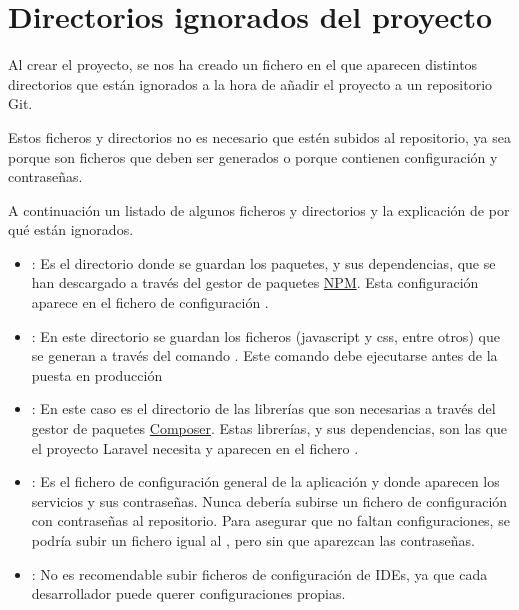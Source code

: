 \chapter{Directorios ignorados del proyecto}

Al crear el proyecto, se nos ha creado un fichero  en el que aparecen distintos directorios que están ignorados a la hora de añadir el proyecto a un repositorio Git.

Estos ficheros y directorios no es necesario que estén subidos al repositorio, ya sea porque son ficheros que deben ser generados o porque contienen configuración y contraseñas.

A continuación un listado de algunos ficheros y directorios y la explicación de por qué están ignorados.

\begin{itemize}
    \item {} : Es el directorio donde se guardan los paquetes, y sus dependencias, que se han descargado a través del gestor de paquetes \href{https://www.npmjs.com/}{NPM}. Esta configuración aparece en el fichero de configuración  .

    \item {} : En este directorio se guardan los ficheros (javascript y css, entre otros) que se generan a través del comando  . Este comando debe ejecutarse antes de la puesta en producción

    \item {} : En este caso es el directorio de las librerías que son necesarias a través del gestor de paquetes \href{https://getcomposer.org/}{Composer}. Estas librerías, y sus dependencias, son las que el proyecto Laravel necesita y aparecen en el fichero  .

    \item {} : Es el fichero de configuración general de la aplicación y donde aparecen los servicios y sus contraseñas. Nunca debería subirse un fichero de configuración con contraseñas al repositorio. Para asegurar que no faltan configuraciones, se podría subir un fichero igual al , pero sin que aparezcan las contraseñas.

    \item {} : No es recomendable subir ficheros de configuración de IDEs, ya que cada desarrollador puede querer configuraciones propias.
\end{itemize}


